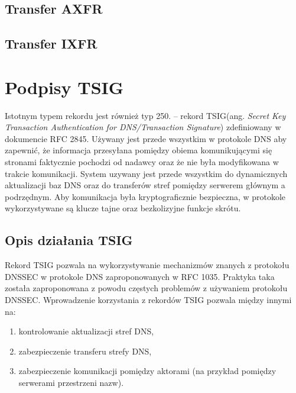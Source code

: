 \subsection{Transfer AXFR}

\subsection{Transfer IXFR}

\section{Podpisy TSIG}\label{TSIG}
Istotnym typem rekordu jest również typ 250. -- rekord TSIG(ang. \textit{Secret Key Transaction Authentication for DNS/Transaction Signature}) zdefiniowany w dokumencie RFC 2845\cite{RFC2845}. Używany jest przede wszystkim w protokole DNS aby zapewnić, że informacja przesyłana pomiędzy obiema komunikującymi się stronami faktycznie pochodzi od nadawcy oraz że nie była modyfikowana w trakcie komunikacji. System uzywany jest przede wszystkim do dynamicznych aktualizacji baz DNS oraz do transferów stref pomiędzy serwerem głównym a podrzędnym. Aby komunikacja była kryptograficznie bezpieczna, w protokole wykorzystywane są klucze tajne oraz bezkolizyjne funkcje skrótu.

\subsection{Opis działania TSIG}
Rekord TSIG pozwala na wykorzystywanie mechanizmów znanych z protokołu DNSSEC\cite{nask-tsig} w protokole DNS zaproponowanych w RFC 1035\cite{RFC1035}. Praktyka taka została zaproponowana z powodu częstych problemów z używaniem protokołu DNSSEC\cite{RFC4033, RFC4035}. Wprowadzenie korzystania z rekordów TSIG pozwala między innymi na:
\begin{enumerate}
	\item kontrolowanie aktualizacji stref DNS,
	\item zabezpieczenie transferu strefy DNS,
	\item zabezpieczenie komunikacji pomiędzy aktorami (na przykład pomiędzy serwerami przestrzeni nazw).
\end{enumerate}


